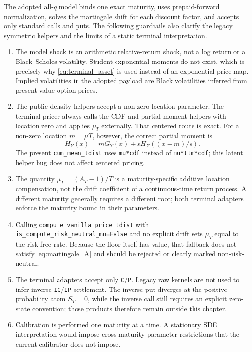 \documentclass[11pt,a4paper]{article}
\newcommand{\cdf}{G}
\begin{document}
The adopted all-$q$ model binds one exact maturity, uses prepaid-forward
normalization, solves the martingale shift for each discount factor, and accepts
only standard calls and puts.  The following guardrails also clarify the legacy
symmetric helpers and the limits of a static terminal interpretation.
\begin{enumerate}
  \item The model shock is an arithmetic relative-return shock, not a log
  return or a Black--Scholes volatility.  Student exponential moments do not
  exist, which is precisely why \eqref{eq:terminal_asset} is used instead of an
  exponential price map.  Implied volatilities in the adopted payload are Black
  volatilities inferred from present-value option prices.
  \item The public density helpers accept a non-zero location parameter.  The
  terminal pricer always calls the CDF and partial-moment helpers with location
  zero and applies $\mu_T$ externally.  That centered route is exact.  For a
  non-zero location $m=\mu T$, however, the correct partial moment is
  \[
    H_Y(x)=m\cdf_Y(x)+sH_Z((x-m)/s).
  \]
  The present \texttt{cum\_mean\_tdist} uses \texttt{mu*cdf} instead of
  \texttt{mu*ttm*cdf}; this latent helper bug does not affect centered pricing.
  \item The quantity $\mu_T=(A_T-1)/T$ is a maturity-specific additive
  location compensation, not the drift coefficient of a continuous-time
  return process.  A different maturity generally requires a different root;
  both terminal adapters enforce the maturity bound in their parameters.
  \item Calling \texttt{compute\_vanilla\_price\_tdist} with
  \texttt{is\_compute\_risk\_neutral\_mu=False} and no explicit drift sets
  $\mu_T$ equal to the risk-free rate.  Because the floor itself has value,
  that fallback does not satisfy \eqref{eq:martingale_A} and should be rejected
  or clearly marked non-risk-neutral.
  \item The terminal adapters accept only \texttt{C}/\texttt{P}.  Legacy raw
  kernels are not used to infer inverse \texttt{IC}/\texttt{IP} settlement.
  The inverse put diverges at the positive-probability atom $S_T=0$, while the
  inverse call still requires an explicit zero-state convention; those products
  therefore remain outside this chapter.
  \item Calibration is performed one maturity at a time.  A stationary SDE
  interpretation would impose cross-maturity parameter restrictions that the
  current calibrator does not impose.
\end{enumerate}
\end{document}
